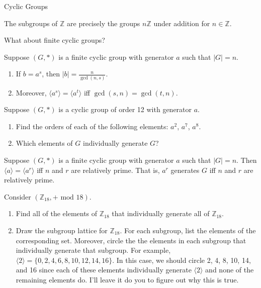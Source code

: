 \begin{section}{Cyclic Groups}
\begin{corollary}\label{cor:subgroups_of_Z}
The subgroups of $\mathbb{Z}$ are precisely the groups $n\mathbb{Z}$ under addition for $n\in \mathbb{Z}$.
\end{corollary}

What about finite cyclic groups?

\begin{theorem}
Suppose $(G,*)$ is a finite cyclic group with generator $a$ such that $|G|=n$.  
\begin{enumerate}
\item If $b=a^s$, then $\displaystyle |b|=\frac{n}{\gcd(n,s)}$.
\item Moreover, $\langle a^s\rangle=\langle a^t\rangle$ iff $\gcd(s,n)=\gcd(t,n)$.
\end{enumerate}
\end{theorem}

\begin{exercise}
Suppose $(G,*)$ is a cyclic group of order 12 with generator $a$. 
\begin{enumerate}[label=\rm{(\alph*)}]
\item Find the orders of each of the following elements: $a^2$, $a^7$, $a^8$.
\item Which elements of $G$ individually generate $G$?
\end{enumerate}
\end{exercise}

\begin{corollary}
Suppose $(G,*)$ is a finite cyclic group with generator $a$ such that $|G|=n$. Then $\langle a\rangle=\langle a^r\rangle$ iff $n$ and $r$ are relatively prime. That is, $a^r$ generates $G$ iff $n$ and $r$ are relatively prime.
\end{corollary}

\begin{exercise}
Consider $(\mathbb{Z}_{18},+\text{ mod }18)$.
\begin{enumerate}[label=\rm{(\alph*)}]
\item Find all of the elements of $\mathbb{Z}_{18}$ that individually generate all of $\mathbb{Z}_{18}$.
\item Draw the subgroup lattice for $\mathbb{Z}_{18}$. For each subgroup, list the elements of the corresponding set.  Moreover, circle the the elements in each subgroup that individually generate that subgroup.  For example, $\langle 2\rangle=\{0,2,4,6,8,10,12,14,16\}$. In this case, we should circle 2, 4, 8, 10, 14, and 16 since each of these elements individually generate $\langle 2\rangle$ and none of the remaining elements do.  I'll leave it do you to figure out why this is true.
\end{enumerate}
\end{exercise}


\end{section}
